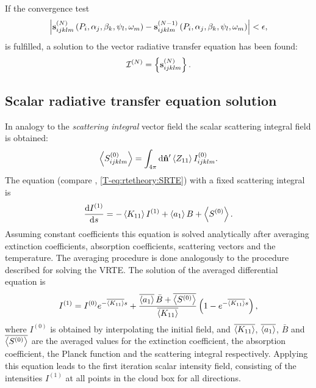 If the convergence test
\begin{equation}
  \left| {\bf s}^{(N)}_{ijklm} \left( P_i, \alpha_j, \beta_k, \psi_l, \omega_m\right)  -  {\bf s}^{(N-1)}_{ijklm} \left( P_i, \alpha_j, \beta_k, \psi_l, \omega_m\right) \right|  < \mathbf{\epsilon},
  \label{eq:scattering:conv_test}
\end{equation}
is fulfilled,
 a solution to the vector radiative transfer equation 
has been found:
\begin{equation}
  {\mathcal I}^{(N)} = \left\{ {\bf s}^{(N)}_{ijklm} \right\}. 
\end{equation}



\subsection{Scalar radiative transfer equation solution}
\label{sec:scattering:scattering:solution_rte_scalar}

In analogy to the \emph{scattering integral} vector field the scalar
scattering integral field is obtained:
\begin{equation}
  \left\langle S^{(0)}_{ijklm} \right\rangle  = \int_{4\pi} \mathrm{d} {\bf \hat{n}}' \left\langle  Z_{11} \right\rangle I^{(0)}_{ijklm}.
\end{equation}
The \emph{} equation (compare \theory, \ref{T-eq:rtetheory:SRTE}) with a
fixed scattering integral is
\begin{equation}
  \label{eq:scattering:SRTE-Int}
  \frac{\mathrm{d} I^{(1)}}{\mathrm{d} s} = -\left\langle  K_{11} \right\rangle I^{(1)}
  + \left\langle a_1 \right\rangle B +\left\langle S^{(0)} \right\rangle.
\end{equation}
Assuming constant coefficients this equation is solved analytically
after averaging extinction coefficients, absorption coefficients,
scattering vectors and the temperature. The averaging procedure is done
analogously to the procedure described for solving the VRTE.  The
solution of the averaged differential equation is
\begin{equation}
\label{eq:scattering:SRTE_sol}
  I^{(1)} = I^{(0)} e^{-\overline{\left\langle K_{11} \right\rangle} s} +
  \frac{\overline{\left\langle a_1 \right\rangle}\, 
    \bar{B} + \overline{\left\langle  S^{(0)} \right\rangle} }
  {\overline{\left\langle  K_{11} \right\rangle} }
  \left(1-e^{-\overline{\left\langle K_{11} \right\rangle} s}\right),
\end{equation}
where $I^{(0)}$ is obtained by interpolating the initial field, and
$\overline{\left\langle K_{11} \right\rangle}$, $\overline{\left\langle a_1 \right\rangle}$,
$\bar{B}$ and $\overline{\left\langle S^{(0)} \right\rangle}$ are the
averaged values for the extinction coefficient, the absorption
coefficient, the 
Planck function and the scattering integral respectively.  Applying
this equation leads to the first iteration scalar intensity field,
consisting of the intensities $I^{(1)}$ at all points in the cloud box
for all directions.
  
